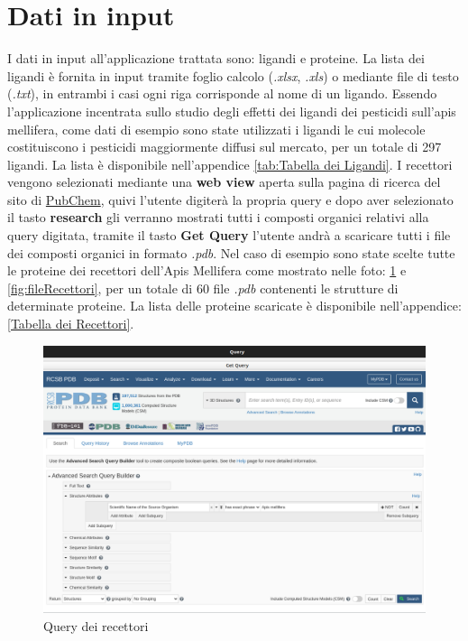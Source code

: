 \section{Dati in input}\label{sec:3.3}
I dati in input all'applicazione trattata sono: ligandi e proteine. La lista dei ligandi è fornita in input tramite foglio calcolo (\textit{.xlsx}, \textit{.xls}) o mediante file di testo (\textit{.txt}), 
in entrambi i casi ogni riga corrisponde al nome di un ligando. Essendo l'applicazione incentrata sullo studio degli effetti dei ligandi dei pesticidi sull'apis mellifera, 
come dati di esempio sono state utilizzati i ligandi le cui molecole costituiscono i pesticidi maggiormente diffusi sul mercato, per un totale di 297 ligandi. La lista è disponibile nell'appendice \ref{tab:Tabella dei Ligandi}.\newline
I recettori vengono selezionati mediante una \textbf{web view} aperta sulla pagina di ricerca del sito di \href{https://www.rcsb.org/search}{PubChem}, quivi l'utente digiterà la propria query e 
dopo aver selezionato il  tasto \textbf{research} gli verranno mostrati tutti i composti organici relativi alla query digitata, tramite il tasto \textbf{Get Query} l'utente andrà a 
scaricare tutti i file  dei composti organici in formato \textit{.pdb}. Nel caso di esempio sono state scelte tutte le proteine dei recettori dell'Apis Mellifera come mostrato nelle foto: 
\ref{fig:queryRecettori} e  \ref{fig:fileRecettori}, per un totale di 60 file \textit{.pdb} contenenti le strutture di determinate proteine. La lista delle proteine scaricate è disponibile nell'appendice: \ref{Tabella dei Recettori}.

\begin{figure}[H]
    \centering
    \includegraphics[scale=0.4]{immagini/queryRecettori.png}
    \caption{Query dei recettori}
    \label{fig:queryRecettori}
\end{figure}

